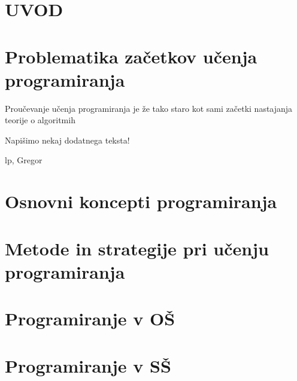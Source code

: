 
\section{UVOD}
\label{sec:Uvod}

\section{Problematika začetkov učenja programiranja}
\label{sec:Problematika_začetkov_učenja_programiranja}

Proučevanje učenja programiranja je že tako staro kot sami začetki
nastajanja teorije o algoritmih \cite{LTProg01}

Napišimo nekaj dodatnega teksta!

lp, Gregor

\section{Osnovni koncepti programiranja}
\label{sec:Osnovni koncepti_programiranja}



\section{Metode in strategije pri učenju programiranja}
\label{sec:Metode_in_strategije_pri_učenju_programiranja}

\section{Programiranje v OŠ}
\label{sec:Programiranje_v_OŠ}

\section{Programiranje v SŠ}
\label{sec:Programiranje_v_SŠ}




